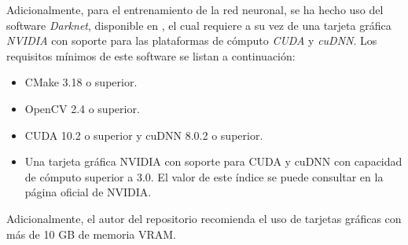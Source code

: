 Adicionalmente, para el entrenamiento de la red neuronal, se ha hecho uso del software \textit{Darknet}, disponible en \cite{darknetgithub}, el cual requiere a su vez de una tarjeta gráfica \textit{NVIDIA} con soporte para las plataformas de cómputo \textit{CUDA} y \textit{cuDNN}. Los requisitos mínimos de este software se listan a continuación:
\begin{itemize}
    \item CMake 3.18 o superior.
    \item OpenCV 2.4 o superior.
    \item CUDA 10.2 o superior y cuDNN 8.0.2 o superior.
    \item Una tarjeta gráfica NVIDIA con soporte para CUDA y cuDNN con capacidad de cómputo superior a 3.0. El valor de este índice se puede consultar en la página oficial de NVIDIA.
\end{itemize}
Adicionalmente, el autor del repositorio recomienda el uso de tarjetas gráficas con más de 10 GB de memoria VRAM.



